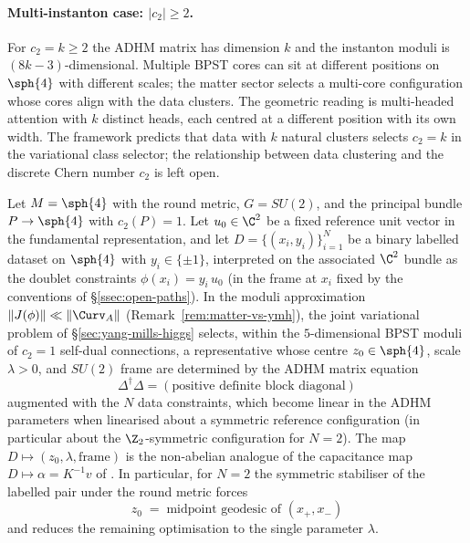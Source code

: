 \paragraph{Multi-instanton case: $|c_2|\geq 2$.} For $c_2=k\geq 2$
the ADHM matrix has dimension $k$ and the instanton moduli is
$(8k-3)$-dimensional. Multiple BPST cores can sit at different
positions on $\sph{4}$ with different scales; the matter sector
selects a multi-core configuration whose cores align with the data
clusters. The geometric reading is multi-headed attention with
$k$ distinct heads, each centred at a different position with its
own width. The framework predicts that data with $k$ natural
clusters selects $c_2=k$ in the variational class selector; the
relationship between data clustering and the discrete Chern number
$c_2$ is left open.

\begin{theorem}[Instanton solve = ADHM with data constraints]\label{thm:instanton}
Let $M=\sph{4}$ with the round metric, $G=SU(2)$, and the principal
bundle $P\to\sph{4}$ with $c_2(P)=1$. Let $u_0\in\C^2$ be a fixed
reference unit vector in the fundamental representation, and let
$D=\{(x_i,y_i)\}_{i=1}^N$ be a binary labelled dataset on $\sph{4}$
with $y_i\in\{\pm 1\}$, interpreted on the associated $\C^2$ bundle
as the doublet constraints $\phi(x_i)=y_i\,u_0$
(in the frame at $x_i$ fixed by the conventions of
\S\ref{ssec:open-paths}). In the moduli approximation
$\|J(\phi)\|\ll\|\Curv_A\|$
(Remark~\ref{rem:matter-vs-ymh}), the joint variational problem of
\S\ref{sec:yang-mills-higgs} selects, within the $5$-dimensional BPST moduli
of $c_2=1$ self-dual connections, a representative whose centre
$z_0\in\sph{4}$, scale $\lambda>0$, and $SU(2)$ frame are determined
by the ADHM matrix equation
\[
   \Delta^\dagger \Delta = (\text{positive definite block diagonal})
\]
augmented with the $N$ data constraints, which become linear in the
ADHM parameters when linearised about a symmetric reference
configuration (in particular about the $\Z_2$-symmetric configuration
for $N=2$). The map $D \mapsto (z_0,\lambda,\text{frame})$ is the
non-abelian analogue of the capacitance map
$D\mapsto\alpha=K^{-1}v$ of \cite[Corollary~13.4]{Vasii2026Paper1}.
In particular, for $N=2$ the symmetric stabiliser of the labelled
pair under the round metric forces
\[
   z_0 \;=\; \text{midpoint geodesic of } (x_+,x_-)
\]
and reduces the remaining optimisation to the single parameter
$\lambda$.
\end{theorem}

